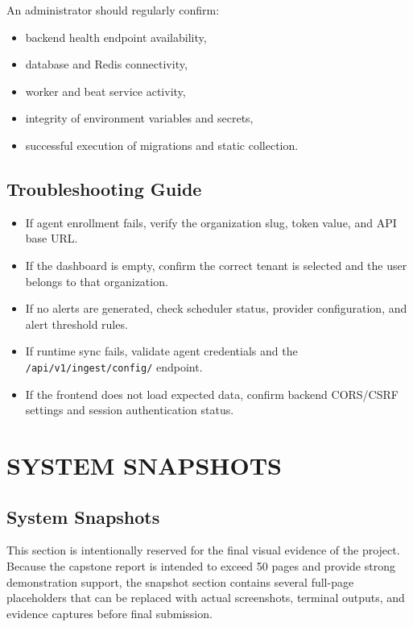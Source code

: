 \documentclass[12pt,a4paper]{article}
\begin{document}
An administrator should regularly confirm:

\begin{itemize}
    \item backend health endpoint availability,
    \item database and Redis connectivity,
    \item worker and beat service activity,
    \item integrity of environment variables and secrets,
    \item successful execution of migrations and static collection.
\end{itemize}

\subsection{Troubleshooting Guide}
\begin{itemize}
    \item If agent enrollment fails, verify the organization slug, token value, and API base URL.
    \item If the dashboard is empty, confirm the correct tenant is selected and the user belongs to that organization.
    \item If no alerts are generated, check scheduler status, provider configuration, and alert threshold rules.
    \item If runtime sync fails, validate agent credentials and the \texttt{/api/v1/ingest/config/} endpoint.
    \item If the frontend does not load expected data, confirm backend CORS/CSRF settings and session authentication status.
\end{itemize}

\clearpage
\section{SYSTEM SNAPSHOTS}

\subsection{System Snapshots}
This section is intentionally reserved for the final visual evidence of the project. Because the capstone report is intended to exceed 50 pages and provide strong demonstration support, the snapshot section contains several full-page placeholders that can be replaced with actual screenshots, terminal outputs, and evidence captures before final submission.
\end{document}
